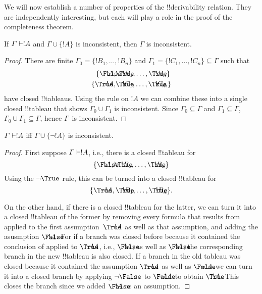 \documentclass[../../../include/open-logic-section]{subfiles}
\begin{document}
      {}
      {}


We will now establish a number of properties of the !!{derivability}
relation.  They are independently interesting, but each will play a
role in the proof of the completeness theorem.

\begin{prop}
  If $\Gamma \Proves !A$ and $\Gamma \cup \{!A\}$ is
  inconsistent, then $\Gamma$ is inconsistent.
\end{prop}

\begin{proof}
There are finite $\Gamma_0 = \{!B_1, \dots, !B_n\}$ and $\Gamma_1
  =\{!C_1, \dots, !C_n\} \subseteq \Gamma$ such that
  \begin{align*}
    \{\sFmla{\False}{!A}, &
    \sFmla{\True}{!B_1}, \dots, \sFmla{\True}{!B_n}\} \\
    \{\sFmla{\True}{\lnot !A}, &
    \sFmla{\True}{!C_1}, \dots, \sFmla{\True}{!C_m}\}
  \end{align*}
  have closed !!{tableau}s.  Using the \Cut{} rule on $!A$ we can
  combine these into a single closed !!{tableau} that shows $\Gamma_0
  \cup \Gamma_1$ is inconsistent.  Since $\Gamma_0
  \subseteq \Gamma$ and $\Gamma_1 \subseteq \Gamma$, $\Gamma_0 \cup
  \Gamma_1 \subseteq \Gamma$, hence $\Gamma$~is inconsistent.
\end{proof}

\begin{prop}
$\Gamma \Proves !A$ iff $\Gamma \cup \{\lnot !A\}$ is inconsistent.
\end{prop}

\begin{proof}
First suppose $\Gamma \Proves !A$, i.e., there is
a closed !!{tableau} for
\[
\{\sFmla{\False}{!A},
\sFmla{\True}{!B_1}, \dots, \sFmla{\True}{!B_n}\}
\]
Using the $\TRule{\True}{\lnot}$ rule, this can be turned into a
closed !!{tableau} for
\[
\{\sFmla{\True}{\lnot !A},
\sFmla{\True}{!B_1}, \dots, \sFmla{\True}{!B_n}\}.
\]

On the other hand, if there is a closed !!{tableau} for the latter, we
can turn it into a closed !!{tableau} of the former by removing every
formula that results from \TRule{\True}{\lnot} applied to the first
assumption~$\sFmla{\True}{\lnot !A}$ as well as that assumption, and
adding the asusmption $\sFmla{\False}{!A}$. For if a branch was closed
before because it contained the conclusion of \TRule{\True}{\lnot}
applied to $\sFmla{\True}{\lnot !A}$, i.e., $\sFmla{\False}{!A}$, as
well as $\sFmla{\False}{!A}$, the corresponding branch in the new
!!{tableau} is also closed. If a branch in the old tableau was closed
because it contained the assumption $\sFmla{\True}{\lnot !A}$ as well
as $\sFmla{\False}{\lnot !A}$ we can turn it into a closed branch by
applying $\TRule{\False}{\lnot}$ to $\sFmla{\False}{\lnot !A}$ to
obtain $\sFmla{\True}{!A}$. This closes the branch since we added
$\sFmla{\False}{!A}$ as an assumption.
\end{proof}
\end{document}
